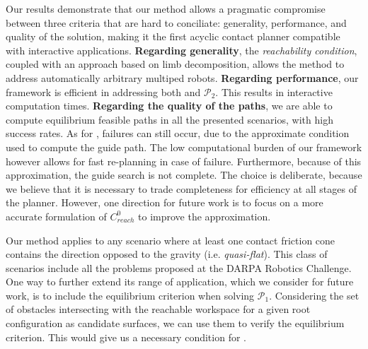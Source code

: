 Our results demonstrate that our method allows a pragmatic compromise between three 
criteria that are hard to conciliate: generality, performance, and quality of the solution, making it the first acyclic contact
planner compatible with \gls{interactive} applications.
%
\textbf{Regarding generality}, the \textit{reachability condition}, coupled with an approach based on limb decomposition, 
allows the method to address automatically arbitrary multiped robots.
%
\textbf{Regarding performance}, our framework is efficient in addressing both \Pa and $\mathcal{P}_2$. This results in \gls{interactive} computation times.
%
\textbf{Regarding the quality of the paths}, we are able to compute
\gls{equilibrium feasible} paths in all the presented scenarios, with high success rates.
As for \cite{Bouyarmane2009}, failures can still occur, due to the approximate condition used to compute the guide path.
The low computational burden of our framework however allows for fast re-planning in case of failure.
Furthermore, because of this approximation, the guide search is not complete. The choice is deliberate, because we believe
that it is necessary to trade completeness for efficiency at all stages of the planner.
However, one direction for future work is to focus on a more accurate formulation of $C_{reach}^0$ to improve
the approximation.

Our method applies to any scenario where at least one contact friction cone contains
the direction opposed to the gravity (i.e. \textit{quasi-flat}). This class of scenarios include all the problems proposed at the DARPA Robotics Challenge.
One way to further extend its range of application, which we consider for future work, is to include the equilibrium criterion when solving $\mathcal{P}_1$.
Considering the set of obstacles intersecting with the reachable workspace for a given root configuration as candidate surfaces, we can use them to verify the equilibrium criterion.
This would give us a necessary condition for \equilibriumfeasibility.

